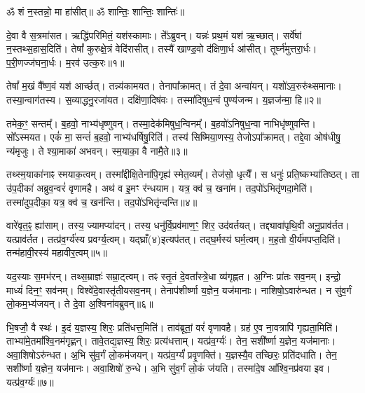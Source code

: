 \setcounter{anuvakam}{0}

ॐ शं न॒स्तन्नो॒ मा हा॑सीत्॥ ॐ शान्तिः॒ शान्तिः॒ शान्तिः॑॥

दे॒वा वै स॒त्रमा॑सत। 
ऋद्धि॑परिमितं॒ यश॑स्कामाः। 
ते᳚ऽब्रुवन्। 
यन्नः॑ प्रथ॒मं यश॑ ऋ॒च्छात्। 
सर्वे॑षां न॒स्तथ्स॒हास॒दिति॑। 
तेषां᳚ कुरुक्षे॒त्रं वेदि॑रासीत्। 
तस्यै॑ खाण्ड॒वो द॑क्षिणा॒र्ध आ॑सीत्। 
तूर्घ्न॑मुत्तरा॒र्धः। 
प॒री॒णज्ज॑घना॒र्धः। 
म॒रव॑ उत्क॒रः॥१॥

तेषां᳚ म॒खं वै᳚ष्ण॒वं यश॑ आर्च्छत्। 
तन्न्य॑कामयत। 
तेनापा᳚क्रामत्। 
तं दे॒वा अन्वा॑यन्। 
यशो॑ऽव॒रुरु॑थ्समानाः। 
तस्या॒न्वाग॑तस्य। 
स॒व्याद्धनु॒रजा॑यत। 
दक्षि॑णा॒दिष॑वः। 
तस्मा॑दिषुध॒न्वं पुण्य॑जन्म। 
य॒ज्ञज॑न्मा॒ हि॥२॥

तमेक॒ꣳ॒ सन्तम्᳚। 
ब॒हवो॒ नाभ्य॑धृष्णुवन्। 
तस्मा॒देक॑मिषुध॒न्वि\-नम्᳚। 
ब॒हवो॑ऽनिषुध॒न्वा नाभिधृ॑ष्णुवन्ति। 
सो᳚ऽस्मयत। 
एकं॑ मा॒ सन्तं॑ ब॒हवो॒ नाभ्य॑धर्\mbox{}षिषु॒रिति॑। 
तस्य॑ सिष्मिया॒णस्य॒ तेजोऽपा᳚क्रामत्। 
तद्दे॒वा ओष॑धीषु॒ न्य॑मृजुः। 
ते श्या॒माका॑ अभवन्। 
स्म॒याका॒ वै नामै॒ते॥३॥

तथ्स्म॒याका॑नाꣴ स्मयाक॒त्वम्। 
तस्मा᳚द्दीक्षि॒तेना॑पि॒गृह्य॑ स्मेत॒व्यम्᳚। 
तेज॑सो॒ धृत्यै᳚। 
स धनुः॑ प्रति॒ष्कभ्या॑तिष्ठत्। 
ता उ॑प॒दीका॑ अब्रुव॒न्वरं॑ वृणामहै। 
अथ॑ व इ॒मꣳ र॑न्धयाम। 
यत्र॒ क्व॑ च॒ खना॑म। 
तद॒पो॑ऽभितृ॑णदा॒मेति॑। 
तस्मा॑दुप॒दीका॒ यत्र॒ क्व॑ च॒ खन॑न्ति। 
तद॒पो॑ऽभितृ॑न्दन्ति॥४॥

वारे॑वृत॒ꣴ॒ ह्या॑साम्। 
तस्य॒ ज्यामप्या॑दन्। 
तस्य॒ धनु॑र्वि॒प्रव॑माण॒ꣳ॒ शिर॒ उद॑वर्तयत्। 
तद्द्यावा॑पृथि॒वी अनु॒प्राव॑र्तत। 
यत्प्राव॑र्तत। 
तत्प्र॑व॒र्ग्य॑स्य प्रवर्ग्य॒त्वम्। 
यद्घ्राँ(४)इत्यप॑तत्। 
तद्\mbox{}घ॒र्मस्य॑ घर्म॒त्वम्। 
म॒ह॒तो वी॒र्य॑मपप्त॒दिति॑। 
तन्म॑हावी॒रस्य॑ महावीर॒त्वम्॥५॥

यद॒स्याः स॒मभ॑रन्। 
तथ्स॒म्राज्ञः॑ सम्रा॒ट्त्वम्। 
तꣴ स्तृ॒तं दे॒वता᳚स्त्रे॒धा व्य॑गृह्णत। 
अ॒ग्निः प्रा॑तः सव॒नम्। 
इन्द्रो॒ माध्यं॑ दिन॒ꣳ॒ सव॑नम्। 
विश्वे॑दे॒वास्तृ॑तीयसव॒नम्। 
तेनाप॑शीर्ष्णा य॒ज्ञेन॒ यज॑मानाः। 
नाशिषो॒ऽवारु॑न्धत। 
न सु॑व॒र्गं लो॒कम॒भ्य॑जयन्। 
ते दे॒वा अ॒श्विना॑वब्रुवन्॥६॥

भि॒षजौ॒ वै स्थः॑। 
इ॒दं य॒ज्ञस्य॒ शिरः॒ प्रति॑धत्त॒मिति॑। 
ताव॑ब्रूतां॒ वरं॑ वृणावहै। 
ग्रह॑ ए॒व ना॒वत्रापि॑ गृह्यता॒मिति॑। 
ताभ्या॑मे॒तमा᳚श्वि॒नम॑गृह्णन्। 
तावे॒तद्य॒ज्ञस्य॒ शिरः॒ प्रत्य॑धत्ताम्। 
यत्प्र॑व॒र्ग्यः॑। 
तेन॒ सशी᳚र्ष्णा य॒ज्ञेन॒ यज॑मानाः। 
अवा॒शिषो\-ऽरु॑न्धत। 
अ॒भि सु॑व॒र्गं लो॒कम॑जयन्। 
यत्प्र॑व॒र्ग्यं॑ प्रवृ॒णक्ति॑। 
य॒ज्ञस्यै॒व तच्छिरः॒ प्रति॑दधाति। 
तेन॒ सशी᳚र्ष्णा य॒ज्ञेन॒ यज॑मानः। 
अवा॒शिषो॑ रु॒न्धे। 
अ॒भि सु॑व॒र्गं लो॒कं ज॑यति। 
तस्मा॑दे॒ष आ᳚श्वि॒नप्र॑वया इव। 
यत्प्र॑व॒र्ग्यः॑॥७॥
\anuvakamend[उ॒त्क॒रो ह्ये॑ते तृ॑न्दन्ति महावीर॒त्वम॑ब्रुवन्नजयन्थ्स॒प्त च॑]

